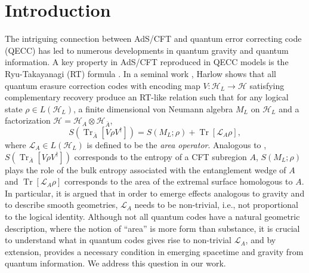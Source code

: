 \documentclass[%
 reprint,
superscriptaddress,
nofootinbib,
 amsmath,amssymb,
 aps,
prx,
floatfix,
]{revtex4-2}
\theoremstyle{definition}
\numberwithin{equation}{section}
\DeclareMathOperator{\Tr}{Tr}
\begin{document}
\section{Introduction}
The intriguing connection between AdS/CFT and quantum error correcting code (QECC) has led to numerous developments in quantum gravity and quantum information\cite{Almheiri:2014lwa}. A key property in AdS/CFT reproduced in QECC models is the Ryu-Takayanagi (RT) formula \cite{Ryu:2006bv,FLM,Hubeny:2007xt}.  In a seminal work \cite{Harlow:2016vwg}, Harlow shows that all quantum erasure correction codes with encoding map $V:\mathcal{H}_L\rightarrow \mathcal{H}$ satisfying complementary recovery produce an RT-like relation such that for any logical state $\rho\in L(\mathcal{H}_L)$, a finite dimensional von Neumann algebra $M_L$ on $\mathcal{H}_L$ and a factorization $\mathcal{H}=\mathcal{H}_A\otimes \mathcal{H}_{\bar{A}}$,
\begin{equation}
    S(\Tr_{\bar{A}} [V\rho V^{\dagger}]) = S(M_L; \rho) +\Tr[\mathcal{L}_A\rho],
    \label{eqn:RT}
\end{equation}
where $\mathcal{L}_A\in L(\mathcal{H}_L)$ is defined to be the \emph{area operator}. 
Analogous to \cite{FLM},  $S(\Tr_{\bar{A}} [V\rho V^{\dagger}])$ corresponds to the entropy of a CFT subregion $A$, $S(M_L; \rho)$ plays the role of the bulk entropy associated with the entanglement wedge of $A$ and $\Tr[\mathcal{L}_A\rho]$ corresponds to the area of the extremal surface  homologous to $A$. In particular, it is argued \cite{Engelhardt:2014gca,Almheiri:2014lwa,Harlow:2016vwg,Cao:2017hrv,Akers:2018fow,Dong:2018seb,Caonote} that in order to emerge effects analogous to gravity and to describe smooth geometries, $\mathcal{L}_A$ needs to be non-trivial, i.e., not proportional to the logical identity.
Although not all quantum codes have a natural geometric description, where the notion of ``area'' is more form than substance, it is crucial to understand what in quantum codes gives rise to non-trivial $\mathcal{L}_A$, and by extension, provides a necessary condition in emerging spacetime and gravity from quantum information. We address this question in our work. 
\end{document}
